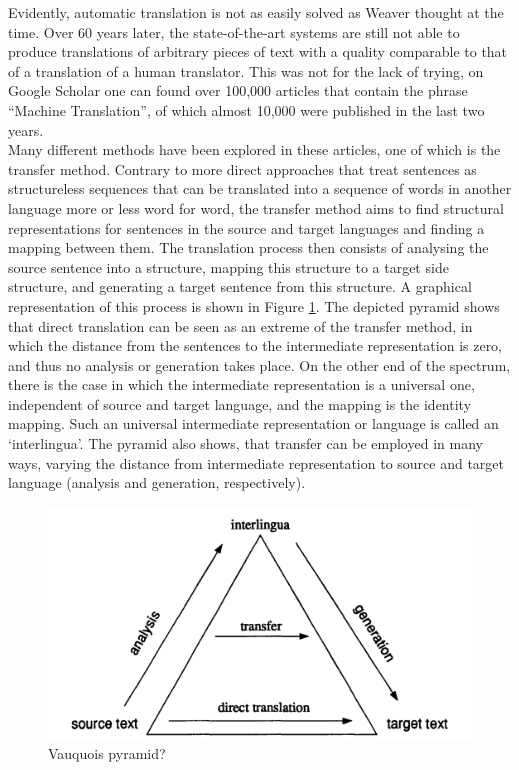 \documentclass[a4paper, 11pt]{report}
\theoremstyle{definition}
\theoremstyle{plain}
\begin{document}
Evidently, automatic translation is not as easily solved as Weaver thought at the time. Over 60 years later, the state-of-the-art systems are still not able to produce translations of arbitrary pieces of text with a quality comparable to that of a translation of a human translator. This was not for the lack of trying, on Google Scholar one can found over 100,000 articles that contain the phrase ``Machine Translation'', of which almost 10,000 were published in the last two years.\\
Many different methods have been explored in these articles, one of which is the transfer method. Contrary to more direct approaches that treat sentences as structureless sequences that can be translated into a sequence of words in another language more or less word for word, the transfer method aims to find structural representations for sentences in the source and target languages and finding a mapping between them. The translation process then consists of analysing the source sentence into a structure, mapping this structure to a target side structure, and generating a target sentence from this structure. A graphical representation of this process is shown in Figure \ref{fig:triangle}. The depicted pyramid shows that direct translation can be seen as an extreme of the transfer method, in which the distance from the sentences to the intermediate representation is zero, and thus no analysis or generation takes place. On the other end of the spectrum, there is the case in which the intermediate representation is a universal one, independent of source and target language, and the mapping is the identity mapping. Such an universal intermediate representation or language is called an `interlingua'. The pyramid also shows, that transfer can be employed in many ways, varying the distance from intermediate representation to source and target language (analysis and generation, respectively). 


\begin{figure}[!ht]
\includegraphics[scale=0.2]{translation_triangle.png}
\caption{Vauquois pyramid?}\label{fig:triangle}
\end{figure}
\end{document}
